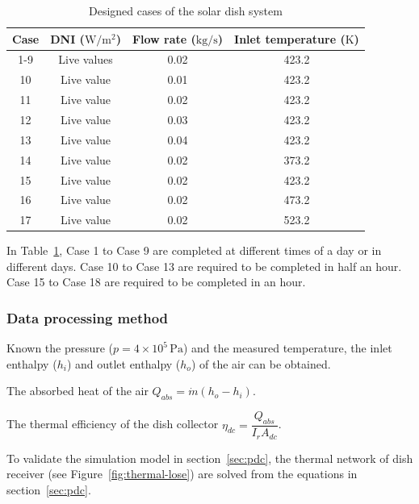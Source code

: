 \begin{table}[htbp]\footnotesize
	\caption{Designed cases of the solar dish system}
	\begin{center}
	\begin{tabular}{cccc}
		\toprule
		Case	& DNI ($\mathrm{W/m^2}$)	&	Flow rate ($\mathrm{kg/s}$)			&	Inlet temperature ($\mathrm{K}$)\\
		\midrule
		1-9	&	Live values	&	0.02	&	423.2\\
		10	&	Live value	&	0.01	&	423.2\\
		11	&	Live value	&	0.02	&	423.2\\
		12	&	Live value	&	0.03	&	423.2\\
		13	&	Live value	&	0.04	&	423.2\\
		14	&	Live value	&	0.02	&	373.2\\
		15	&	Live value	&	0.02	&	423.2\\
		16	&	Live value	&	0.02	&	473.2\\
		17	&	Live value	&	0.02	&	523.2\\
		\bottomrule
	\end{tabular}
	\end{center}
	\label{tab:DesignedCasesForDish}
\end{table}

In Table~\ref{tab:DesignedCasesForDish}, Case 1 to Case 9 are completed at different times of a day or in different days. Case 10 to Case 13 are required to be completed in half an hour. Case 15 to Case 18 are required to be completed in an hour.

\subsubsection{Data processing method}
Known the pressure ($p = 4\times10^5\,\mathrm{Pa}$) and the measured temperature, the inlet enthalpy ($h_i$) and outlet enthalpy ($h_o$) of the air can be obtained.

The absorbed heat of the air $Q_{abs} = \dot{m}(h_o - h_i)$.

The thermal efficiency of the dish collector $\eta_{dc} = \dfrac{Q_{abs}}{I_r A_{dc}}$. 

To validate the simulation model in section~\ref{sec:pdc}, %
the thermal network of dish receiver (see Figure~\ref{fig:thermal-lose}) are solved from the equations in section~\ref{sec:pdc}.

